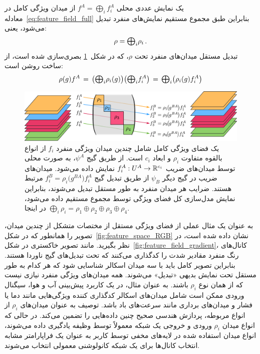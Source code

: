 				یک نمایش عددی محلی $f^A = \bigoplus_i f_i^A$ از میدان ویژگی کامل در معادله~\eqref{eq:feature_field_full} بنابراین طبق مجموع مستقیم نمایش‌های منفرد تبدیل می‌شود، یعنی:
				\begin{align}
					\rho = \scalebox{1.1}{$\bigoplus$}_i \rho_i \,.
				\end{align}
				تبدیل مستقل میدان‌های منفرد تحت $\rho$، که در شکل~\ref{fig:feature_spaces_oplus} بصری‌سازی شده است، از ساخت روشن است:
				\begin{align}
					\rho(g)f^A
					\,=\, \left(\scalebox{1.1}{$\bigoplus$}_i \rho_i(g)\right) \! \left(\scalebox{1.1}{$\bigoplus$}_i f_i^A\right)
					\,=\, \scalebox{1.1}{$\bigoplus$}_i \! \left(\rho_i(g) f_i^A\right)
				\end{align}
				
				\begin{figure}
					\centering
					\includegraphics[width=.94\textwidth]{figures/feature_field_repr_examples.pdf}
					\vspace*{0ex}
					\caption{\small
						یک فضای ویژگی کامل شامل چندین میدان ویژگی منفرد $f_i$ از انواع بالقوه متفاوت $\rho_i$ و ابعاد $c_i$ است.
						از طریق گیج $\psi^A$، به صورت محلی توسط میدان‌های ضریب $f_i^A: U^A \to \mathbb{R}^{c_i}$ نمایش داده می‌شود.
						میدان‌های ضریب در گیج دیگر $\psi_B$ از طریق تبدیل گیج $f_i^B = \rho_i\big(g^{BA}\big)f_i^A$ مرتبط هستند.
						ضرایب هر میدان منفرد به طور مستقل تبدیل می‌شوند، بنابراین نمایش مدل‌سازی کل فضای ویژگی توسط مجموع مستقیم داده می‌شود، در اینجا $\bigoplus_i \!\rho_i = \rho_1 \oplus \rho_2 \oplus \rho_3 \oplus \rho_4$.
					}
					\label{fig:feature_spaces_oplus}
					\end{figure}

						به عنوان یک مثال عملی از فضای ویژگی مستقل از مختصات متشکل از چندین میدان، تصویر  را همانطور که در شکل~\ref{fig:feature_space_RGB} نشان داده شده است، در نظر بگیرید.
						مانند تصویر خاکستری در شکل~\ref{fig:feature_field_gradient}، کانال‌های رنگ منفرد مقادیر شدت را کدگذاری می‌کنند که تحت تبدیل‌های گیج ناوردا هستند.
						بنابراین تصویر  کامل باید با سه میدان اسکالر شناسایی شود که هر کدام به طور مستقل تحت نمایش بدیهی «تبدیل» می‌شوند.
						همه میدان‌های ویژگی منفرد نیازی نیست که از همان نوع $\rho_i$ باشند.
						به عنوان مثال، در یک کاربرد پیش‌بینی آب و هوا، سیگنال ورودی ممکن است شامل میدان‌های اسکالر کدگذاری کننده ویژگی‌هایی مانند دما یا فشار و میدان‌های برداری مانند سرعت‌های باد باشد.
						توصیف به عنوان میدان‌های $\rho_i$ از انواع مربوطه، پردازش هندسی صحیح چنین داده‌هایی را تضمین می‌کند.
						در حالی که انواع میدان $\rho_i$ ورودی و خروجی یک شبکه معمولاً توسط وظیفه یادگیری داده می‌شوند، انواع میدان استفاده شده در لایه‌های مخفی توسط کاربر به عنوان یک فراپارامتر مشابه انتخاب کانال‌ها برای یک شبکه کانولوشنی معمولی انتخاب می‌شوند.